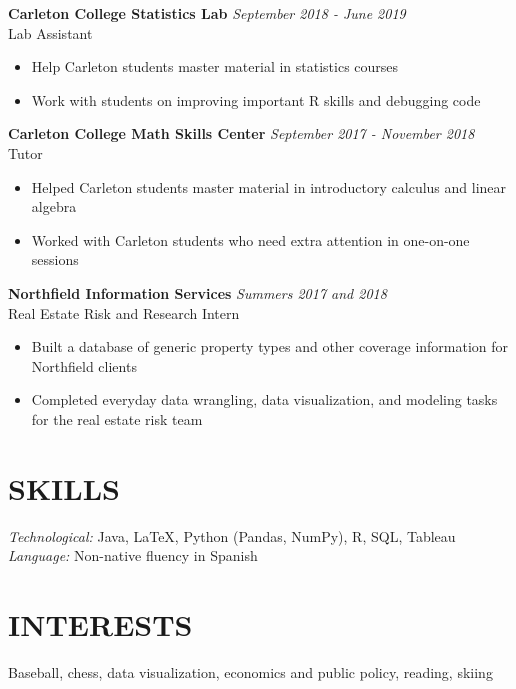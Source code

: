 \documentclass[margin, 9pt]{res} %
\begin{document}
\begin{resume}
{\sl} \textbf{Carleton College Statistics Lab} \hfill \textit{September 2018 - June 2019}\\
{\sl} Lab Assistant \smallskip
{\sl} \begin{itemize}
\item Help Carleton students master material in statistics courses
\item Work with students on improving important R skills and debugging code
\end{itemize}

{\sl} \textbf{Carleton College Math Skills Center} \hfill \textit{September 2017 - November 2018}\\
{\sl} Tutor \smallskip
{\sl} \begin{itemize}
\item Helped Carleton students master material in introductory calculus and linear algebra
\item Worked with Carleton students who need extra attention in one-on-one sessions
\end{itemize}

{\sl} \textbf{Northfield Information Services} \hfill \textit{Summers 2017 and 2018}\\
{\sl} Real Estate Risk and Research Intern \smallskip
{\sl} \begin{itemize}
\item Built a database of generic property types and other coverage information for Northfield clients
\item Completed everyday data wrangling, data visualization, and modeling tasks for the real estate risk team
\end{itemize}


\section{SKILLS}
{\sl Technological:} Java, LaTeX, Python (Pandas, NumPy), R, SQL, Tableau\\ \smallskip
{\sl Language:} Non-native fluency in Spanish

\section{INTERESTS}
{\sl} Baseball, chess, data visualization, economics and public policy, reading, skiing

\end{resume}
\end{document}
